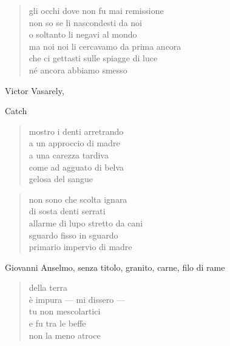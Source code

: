 	\begin{verse}
		gli occhi dove non fu mai remissione\\
		non so se li nascondesti da noi\\
		o soltanto li negavi al mondo\\
		ma noi noi li cercavamo da prima ancora\\
		che ci gettasti sulle spiagge di luce\\
		né ancora abbiamo smesso
	\end{verse}

\clearpage


\begin{artItem}
	Victor Vasarely, \begin{otherlanguage}{english}%
		Catch%
	\end{otherlanguage}
\end{artItem}

	\begin{verse}
		mostro i denti arretrando\\
		a un approccio di madre\\
		a una carezza tardiva\\
		come ad agguato di belva\\
		gelosa del sangue
	\end{verse}

	\begin{verse}
		non sono che scolta ignara\\
		di sosta denti serrati\\
		allarme di lupo stretto da cani\\
		sguardo fisso in sguardo\\
		primario impervio di madre
	\end{verse}

\clearpage


\begin{artItem}
	Giovanni Anselmo, senza titolo, granito, carne, filo di rame
\end{artItem}

	\begin{verse}
		della terra\\
		è impura — mi dissero —\\
		tu non mescolartici\\
		e fu tra le beffe\\
		non la meno atroce
	\end{verse}

